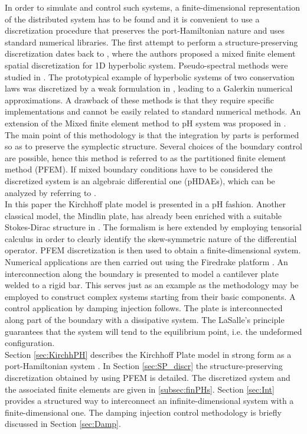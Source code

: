 \documentclass[letterpaper, 10 pt, conference]{ieeeconf}
\begin{document}
In order to simulate and control such systems, a finite-dimensional representation of the distributed system has to be found and it is convenient to use a discretization procedure that preserves the port-Hamiltonian nature and uses standard numerical libraries. The first attempt to perform a structure-preserving discretization dates back to \cite{Golo}, where the authors proposed a mixed finite element spatial discretization for 1D hyperbolic system. Pseudo-spectral methods were studied in \cite{moulla:hal-01625008}. The prototypical example of hyperbolic systems of two conservation laws was discretized by a weak formulation in \cite{WeakForm_Kot}, leading to a Galerkin numerical approximations. A drawback of these methods is that they require specific implementations and cannot be easily related to standard numerical methods. An extension of the Mixed finite element method to pH system was proposed in \cite{CardosoRibeiro2018}. The main point of this methodology is that the integration by parts is performed so as to preserve the symplectic structure. Several choices of the boundary control are possible, hence this method is referred to as the partitioned finite element method (PFEM). If mixed boundary conditions have to be considered the discretized system is an algebraic differential one (pHDAEs), which can be analyzed by referring to \cite{beattie2018linear,vanderSchaft2013}. \\

In this paper the Kirchhoff plate model is presented in a pH fashion. Another classical model, the Mindlin plate, has already been enriched with a suitable Stokes-Dirac structure in \cite{MacchelliMindlin}. The formalism is here extended by employing  tensorial calculus in order to clearly identify the skew-symmetric nature of the differential operator. PFEM discretization is then used to obtain a finite-dimensional system. Numerical applications are then carried out using the Firedrake platform \cite{firedrake}. An interconnection along the boundary is presented to model a cantilever plate welded to a rigid bar. This serves just as an example as the methodology may be employed to construct complex systems starting from their basic components. A control application by damping injection follows. The plate is interconnected along part of the boundary with a dissipative system. The LaSalle's principle guarantees that the system will tend to the equilibrium point, i.e. the undeformed configuration. \\

Section \ref{sec:KirchhPH} describes the Kirchhoff Plate model in strong form as a port-Hamiltonian system . In Section \ref{sec:SP_discr} the structure-preserving discretization obtained by using PFEM  is detailed. The discretized system and the associated finite elements are given in \ref{subsec:finPHs}. Section \ref{sec:Int} provides a structured way to interconnect an infinite-dimensional system with a finite-dimensional one. The damping injection control methodology is briefly discussed in Section \ref{sec:Damp}. 
\end{document}
